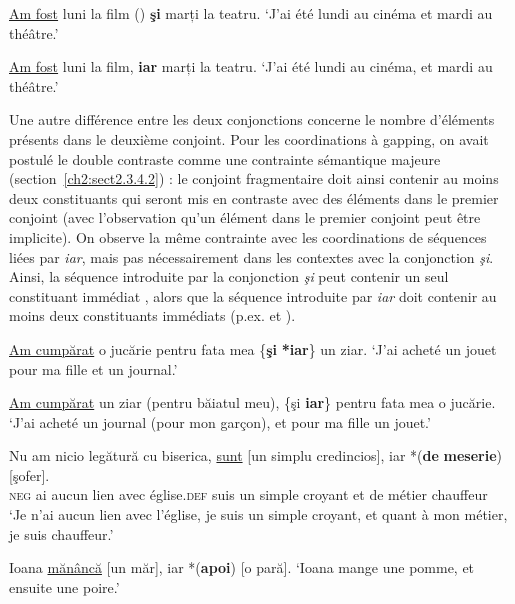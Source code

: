 \ea \label{ch2:ex313}
\ea \uline{Am fost} luni la film ({\textbar}) \textbf{şi} marți la teatru. \label{ch2:ex313a}
\glt ‘J’ai été lundi au cinéma et mardi au théâtre.’

\ex \uline{Am fost} luni la film, {\textbar} \textbf{iar} marți la teatru. \label{ch2:ex313b}
\glt ‘J’ai été lundi au cinéma, et mardi au théâtre.’
\z
\z

Une autre différence entre les deux conjonctions concerne le nombre d’éléments présents dans le deuxième conjoint. Pour les coordinations à gapping, on avait postulé le double contraste comme une contrainte sémantique majeure (section~\ref{ch2:sect2.3.4.2}) : le conjoint fragmentaire doit ainsi contenir au moins deux constituants qui seront mis en contraste avec des éléments dans le premier conjoint (avec l’observation qu’un élément dans le premier conjoint peut être implicite). On observe la même contrainte avec les coordinations de séquences liées par \textit{iar}, mais pas nécessairement dans les contextes avec la conjonction \textit{şi}. Ainsi, la séquence introduite par la conjonction \textit{şi} peut contenir un seul constituant immédiat , alors que la séquence introduite par \textit{iar} doit contenir au moins deux constituants immédiats (p.ex.  et ). 

\ea \label{ch2:ex314}
\ea \uline{Am cumpărat} o jucărie pentru fata mea \{\textbf{şi} {\textbar} \textbf{*iar}\} un ziar. \label{ch2:ex314a}
\glt ‘J’ai acheté un jouet pour ma fille et un journal.’

\ex \uline{Am cumpărat} un ziar (pentru băiatul meu), \{şi {\textbar} \textbf{iar}\} pentru fata mea o jucărie. \label{ch2:ex314b}
\glt ‘J’ai acheté un journal (pour mon garçon), et pour ma fille un jouet.’
\z
\z


\ea \label{ch2:ex315}
\ea 
\gll Nu  am  nicio  legătură  cu  biserica,  \uline{sunt} [un  simplu  credincios],  iar *(\textbf{de} \textbf{meserie})  [şofer]. \label{ch2:ex315a}\\
\textsc{neg}  ai  aucun  lien  avec  église.\textsc{def} suis  un  simple  croyant et de  métier  chauffeur\\
\glt ‘Je n’ai aucun lien avec l’église, je suis un simple croyant, et quant à mon métier, je suis chauffeur.’

\ex Ioana \uline{mănâncă} [un măr], iar *(\textbf{apoi}) [o pară]. \label{ch2:ex315b}
\glt ‘Ioana mange une pomme, et ensuite une poire.’
\z
\z

